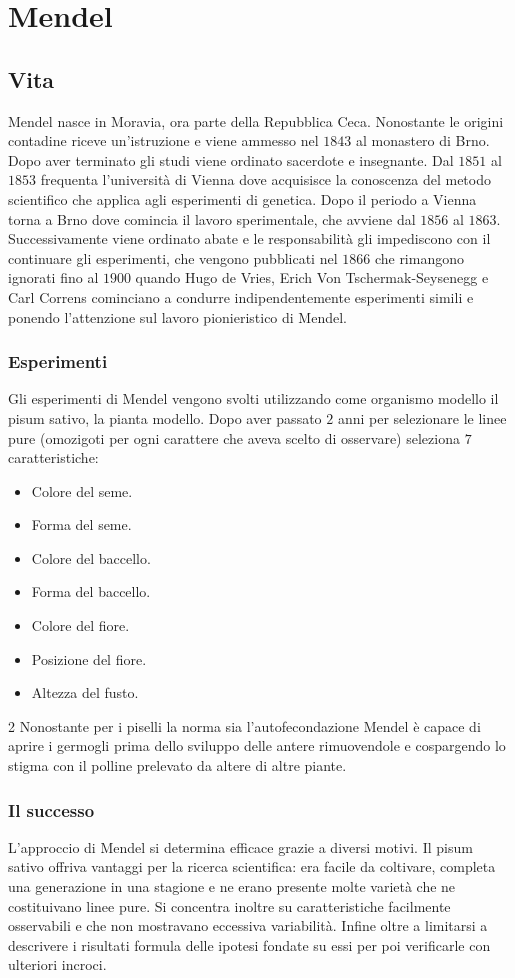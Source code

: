 \chapter{Mendel}
\section{Vita}
Mendel nasce in Moravia, ora parte della Repubblica Ceca. Nonostante le origini contadine riceve un'istruzione e viene ammesso nel $1843$ al monastero di Brno. Dopo aver terminato gli studi viene ordinato
sacerdote e insegnante. Dal $1851$ al $1853$ frequenta l'universit\`a di Vienna dove acquisisce la conoscenza del metodo scientifico che applica agli esperimenti di genetica. Dopo il periodo a Vienna
torna a Brno dove comincia il lavoro sperimentale, che avviene dal $1856$ al $1863$. Successivamente viene ordinato abate e le responsabilit\`a gli impediscono con il continuare gli esperimenti, che 
vengono pubblicati nel $1866$ che rimangono ignorati fino al $1900$ quando Hugo de Vries, Erich Von Tschermak-Seysenegg e Carl Correns cominciano a condurre indipendentemente esperimenti simili e 
ponendo l'attenzione sul lavoro pionieristico di Mendel.
\subsection{Esperimenti}
Gli esperimenti di Mendel vengono svolti utilizzando come organismo modello il pisum sativo, la pianta modello. Dopo aver passato $2$ anni per selezionare le linee pure (omozigoti per ogni carattere che
aveva scelto di osservare) seleziona $7$ caratteristiche:
\begin{multicols}{2}
	\begin{itemize}
		\item Colore del seme.
		\item Forma del seme.
		\item Colore del baccello.
		\item Forma del baccello.
		\item Colore del fiore.
		\item Posizione del fiore.
		\item Altezza del fusto.
	\end{itemize}
\end{multicols}{2}
Nonostante per i piselli la norma sia l'autofecondazione Mendel \`e capace di aprire i germogli prima dello sviluppo delle antere rimuovendole e cospargendo lo stigma con il polline prelevato da 
altere di altre piante.
\subsection{Il successo}
L'approccio di Mendel si determina efficace grazie a diversi motivi. Il pisum sativo offriva vantaggi per la ricerca scientifica: era facile da coltivare, completa una generazione in una stagione e ne
erano presente molte variet\`a che ne costituivano linee pure. Si concentra inoltre su caratteristiche facilmente osservabili e che non mostravano eccessiva variabilit\`a. Infine oltre a limitarsi a 
descrivere i risultati formula delle ipotesi fondate su essi per poi verificarle con ulteriori incroci. 
